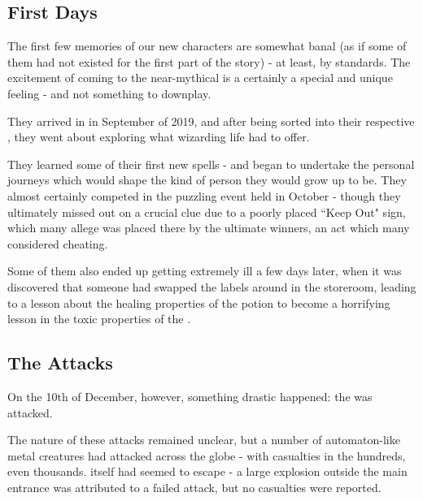 \documentclass[oneside, 9pt,english]{extbook}
\title{\key{Memories of the Past}}
\date{September - March, 2020}
\begin{document}
	\maketitle
	
	\subsection{First Days}
	
	The first few memories of our new characters are somewhat banal (as if some of them had not existed for the first part of the story) - at least, by  standards. The excitement of coming to the near-mythical  is a certainly a special and unique feeling - and not something to downplay.  

	They arrived in  in September of 2019, and after being sorted into their respective , they went about exploring what wizarding life had to offer.
	
	They learned some of their first new spells - and began to undertake the personal journeys which would shape the kind of person they would grow up to be. They almost certainly competed in the puzzling  event held in October - though they ultimately missed out on a crucial clue due to a poorly placed ``Keep Out" sign, which many allege was placed there by the ultimate winners, an act which many considered cheating. 
	
	Some of them also ended up getting extremely ill a few days later, when it was discovered that someone had swapped the labels around in the  storeroom, leading to a lesson about the healing properties of the  potion to become a horrifying lesson in the toxic properties of the .
	
	\subsection{The Attacks}
	
	On the 10th of December, however, something drastic happened: the  was attacked.
	
	The nature of these attacks remained unclear, but a number of automaton-like metal creatures had attacked  across the globe - with casualties in the hundreds, even thousands.  itself had seemed to escape - a large explosion outside the main entrance was attributed to a failed attack, but no casualties were reported. 
	
\end{document}
